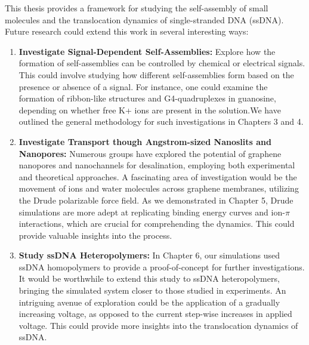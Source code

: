This thesis provides a framework for studying the self-assembly of small molecules and the translocation dynamics of single-stranded DNA (ssDNA). Future research could extend this work in several interesting ways:
\begin{enumerate}
    \item \textbf{Investigate Signal-Dependent Self-Assemblies:} Explore how the formation of self-assemblies can be controlled by chemical or electrical signals. This could involve studying how different self-assemblies form based on the presence or absence of a signal. For instance, one could examine the formation of ribbon-like structures and G4-quadruplexes in guanosine, depending on whether free K+ ions are present in the solution.We have outlined the general methodology for such investigations in Chapters 3 and 4.

    \item \textbf{Investigate Transport though Angstrom-sized Nanoslits and Nanopores:} Numerous groups have explored the potential of graphene nanopores and nanochannels for desalination, employing both experimental and theoretical approaches. A fascinating area of investigation would be the movement of ions and water molecules across graphene membranes, utilizing the Drude polarizable force field. As we demonstrated in Chapter 5, Drude simulations are more adept at replicating binding energy curves and ion-$\pi$ interactions, which are crucial for comprehending the dynamics. This could provide valuable insights into the process.

    \item \textbf{Study ssDNA Heteropolymers:} In Chapter 6, our simulations used ssDNA homopolymers to provide a proof-of-concept for further investigations. It would be worthwhile to extend this study to ssDNA heteropolymers, bringing the simulated system closer to those studied in experiments. An intriguing avenue of exploration could be the application of a gradually increasing voltage, as opposed to the current step-wise increases in applied voltage. This could provide more insights into the translocation dynamics of ssDNA.
\end{enumerate}
